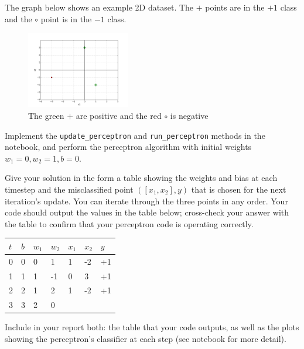 \begin{problem}[8]
  The graph below shows an example 2D dataset. The $+$ points are in the $+1$ class and the $\circ$ point is in the $-1$ class. 

  \begin{figure}[H]
    \centering
    \includegraphics[width=0.4\textwidth]{images/perceptron.png}
    \caption{The green $+$ are positive and the red $\circ$ is negative}
    \label{fig:figure1}
  \end{figure}
  
 Implement the \texttt{update_perceptron} and \texttt{run_perceptron} methods in the notebook, and perform the perceptron algorithm with initial weights $w_1 = 0, w_2 = 1, b = 0$.

  Give your solution in the form a table showing the weights and bias at each timestep and the misclassified point $([x_1,x_2],y)$ that is chosen for the next iteration's update. You can iterate through the three points in any order. Your code should output the values in the table below; cross-check your answer with the table to confirm that your perceptron code is operating correctly.

  \begin{table}[H]
    \centering

    \begin{tabular}{l|lll|ll|l}
    \hline

    \hline
    $t$ & $b$ & $w_1$ & $w_2$ & $x_1$ & $x_2$ & $y$ \\
    \hline
      0  &  0 & 0 & 1  & 1 & -2 & +1\\
      1  &  1 & 1 & -1 & 0 & 3 & +1\\
      2  &  2 & 1 & 2 & 1 & -2 & +1\\
      3  &  3 & 2 & 0 \\
    \hline
    \end{tabular}
  \end{table}
  
  Include in your report both: the table that your code outputs, as well as the plots showing the perceptron's classifier at each step (see notebook for more detail).
  
  
\end{problem}
